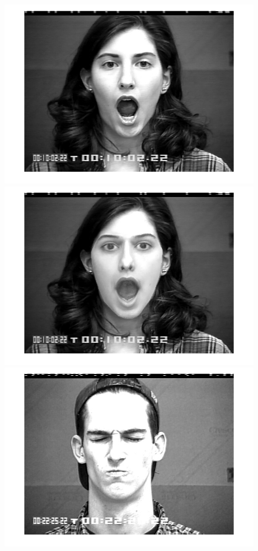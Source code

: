\begin{figure}[!htb]
    	\includegraphics[scale=.10]{figure/77/15.png}
    	\includegraphics[scale=.10]{figure/77de/15.png}
    	\hspace{1cm}
    	\includegraphics[scale=.10]{figure/89/33.png}

\end{figure}
